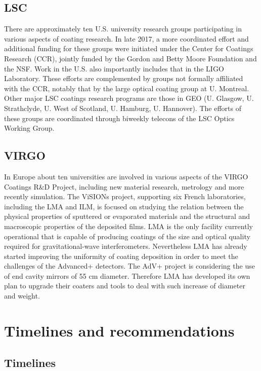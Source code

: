 \subsection{LSC}

There are approximately ten U.S. university research groups participating in various aspects of coating research. In late 2017, a more coordinated effort and additional funding for these groups were initiated under the Center for Coatings Research (CCR), jointly funded by the Gordon and Betty Moore Foundation and the NSF. Work in the U.S. also importantly includes that in the LIGO Laboratory. These efforts are complemented by groups not formally affiliated with the CCR, notably that by the large optical coating group at U. Montreal. Other major LSC coatings research programs are those in GEO (U. Glasgow, U. Strathclyde, U. West of Scotland, U. Hamburg, U. Hannover). The efforts of these groups are coordinated through biweekly telecons of the LSC Optics Working Group.

\subsection{VIRGO}

In Europe about ten universities are involved in various aspects of the VIRGO Coatings R\&D Project, including new material research, metrology and more recently simulation. The ViSIONs project, supporting six French laboratories, including the LMA and ILM, is focused on studying the relation between the physical properties of sputtered or evaporated materials and the structural and macroscopic properties of the deposited films. LMA is the only facility currently operational that is capable of producing coatings of the size and optical quality required for gravitational-wave interferometers. Nevertheless LMA has already started improving the uniformity of coating deposition in order to meet the challenges of the Advanced+ detectors. The AdV+ project is considering the use of end cavity mirrors of 55 cm diameter. Therefore LMA has developed its own plan to upgrade their coaters and tools to deal with such increase of diameter and weight.

\section{Timelines and recommendations}
\label{coatings_Recomm}
\subsection{Timelines}

